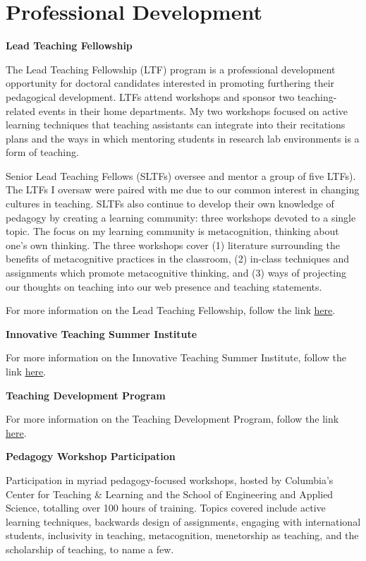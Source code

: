 \pagestyle{plain}
\chapter[Professional Development][Professional Development]{Professional Development}
\raggedright

\textbf{Lead Teaching Fellowship}

{\color{red}The Lead Teaching Fellowship (LTF) program is a professional development opportunity for doctoral candidates interested in promoting furthering their pedagogical development. LTFs attend workshops and sponsor two teaching-related events in their home departments. My two workshops focused on active learning techniques that teaching assistants can integrate into their recitations plans and the ways in which mentoring students in research lab environments is a form of teaching.

\medskip Senior Lead Teaching Fellows (SLTFs) oversee and mentor a group of five LTFs). The LTFs I oversaw were paired with me due to our common interest in changing cultures in teaching. SLTFs also continue to develop their own knowledge of pedagogy by creating a learning community: three workshops devoted to a single topic. The focus on my learning community is metacognition, thinking about one's own thinking. The three workshops cover (1) literature surrounding the benefits of metacognitive practices in the classroom, (2) in-class techniques and assignments which promote metacognitive thinking, and (3) ways of projecting our thoughts on teaching into our web presence and teaching statements.}

For more information on the Lead Teaching Fellowship, follow the link \href{https://ctl.columbia.edu/graduate-instructors/opportunities-for-graduate-students/lead-teaching-fellows/}{\underline{here}}.

\medskip
\textbf{Innovative Teaching Summer Institute}

For more information on the Innovative Teaching Summer Institute, follow the link \href{https://ctl.columbia.edu/innovative-teaching-summer-institute/}{\underline{here}}.

\medskip
\textbf{Teaching Development Program}

For more information on the Teaching Development Program, follow the link \href{https://ctl.columbia.edu/graduate-instructors/ctl-teaching-development-program/}{\underline{here}}.

\medskip
\textbf{Pedagogy Workshop Participation}

{\color{red}Participation in myriad pedagogy-focused workshops, hosted by Columbia's Center for Teaching \& Learning and the School of Engineering and Applied Science, totalling over 100 hours of training. Topics covered include active learning techniques, backwards design of assignments, engaging with international students, inclusivity in teaching, metacognition, menetorship as teaching, and the scholarship of teaching, to name a few.}